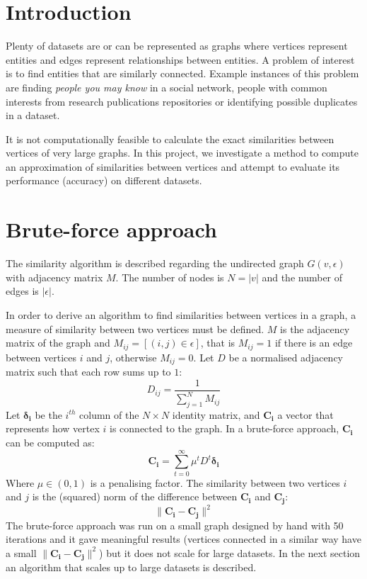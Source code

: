 \documentclass[12pt]{report}
\begin{document}
\section*{Introduction}
%
Plenty of datasets are or can be represented as graphs where vertices represent
entities and edges represent relationships between entities. A problem of interest
is to find entities that are similarly connected. Example instances of this
problem are finding \textit{people you may know} in a social network, people with
common interests from research publications repositories or identifying possible
duplicates in a dataset.


It is not computationally feasible to calculate the exact similarities between
vertices of very large graphs. In this project, we investigate a method to compute
an approximation of similarities between vertices and attempt to evaluate its
performance (accuracy) on different datasets.


%
%
\section*{Brute-force approach}
%
The similarity algorithm is described regarding the undirected graph $G(v, \epsilon)$
with adjacency matrix $M$. The number of nodes is $N = |v|$ and the number of
edges is $|\epsilon|$.


In order to derive an algorithm to find similarities between vertices in a graph,
a measure of similarity between two vertices must be defined. $M$ is the adjacency
matrix of the graph and $M_{i j} = [(i,j) \in \epsilon]$, that is $M_{i j} = 1$
if there is an edge between vertices $i$ and $j$, otherwise $M_{i j} = 0$. Let
$D$ be a normalised adjacency matrix such that each row sums up to $1$:
%
\begin{equation}
\label{eq:initial-d}
D_{i j} = \frac{1}{\sum_{j=1}^N M_{ij}}
\end{equation}
%
Let $\mathbf{\delta_i}$ be the $i^{th}$ column of the $N \times N$ identity matrix,
and $\mathbf{C_i}$ a vector that represents how vertex $i$ is connected to the graph.
In a brute-force approach, $\mathbf{C_i}$ can be computed as:
%
\begin{equation}
\label{eq:brute-ci}
\mathbf{C_i} = \sum_{t=0}^\infty \mu^t D^t \mathbf{\delta_i}
\end{equation}
%
Where $\mu \in (0,1)$ is a penalising factor. The similarity between two vertices
$i$ and $j$ is the (squared) norm of the difference between $\mathbf{C_i}$ and
$\mathbf{C_j}$:
%
\begin{equation}
\|\mathbf{C_i} - \mathbf{C_j}\|^2
\end{equation}
%
The brute-force approach was run on a small graph designed by hand with 50 iterations
and it gave meaningful results (vertices connected in a similar way have a small
$\|\mathbf{C_i} - \mathbf{C_j}\|^2$) but it does not scale for large datasets. In
the next section an algorithm that scales up to large datasets is described.
\end{document}
